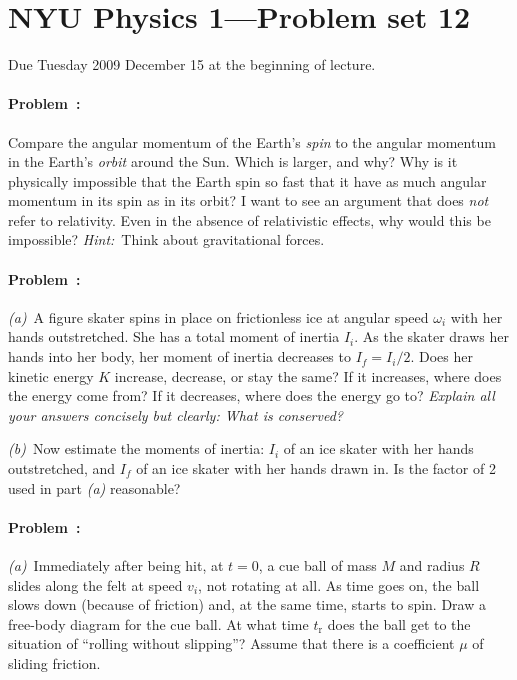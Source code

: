 \documentclass[12pt]{article}
\begin{document}
\thispagestyle{empty}

\section*{NYU Physics 1---Problem set 12}

Due Tuesday 2009 December 15 at the beginning of lecture.

\paragraph{Problem~\theproblem:}%
Compare the angular momentum of the Earth's \emph{spin} to the angular
momentum in the Earth's \emph{orbit} around the Sun.  Which is larger,
and why?  Why is it physically impossible that the Earth spin so fast
that it have as much angular momentum in its spin as in its orbit?  I
want to see an argument that does \emph{not} refer to relativity.
Even in the absence of relativistic effects, why would this be
impossible?  \emph{Hint:}~Think about gravitational forces.

\paragraph{Problem~\theproblem:}%
\textsl{(a)}~A figure skater spins in place on frictionless ice at
angular speed $\omega_i$ with her hands outstretched.  She has a total
moment of inertia $I_i$.  As the skater draws her hands into her body,
her moment of inertia decreases to $I_f=I_i/2$.  Does her kinetic
energy $K$ increase, decrease, or stay the same?  If it increases,
where does the energy come from?  If it decreases, where does the
energy go to?  \emph{Explain all your answers concisely but clearly:
What is conserved?}

\textsl{(b)}~Now estimate the moments of inertia: $I_i$ of an ice
skater with her hands outstretched, and $I_f$ of an ice skater with
her hands drawn in.  Is the factor of 2 used in part \textsl{(a)}
reasonable?

\paragraph{Problem~\theproblem:}%
\textsl{(a)}~Immediately after being hit, at $t=0$, a cue ball of mass
$M$ and radius $R$ slides along the felt at speed $v_i$, not rotating
at all.  As time goes on, the ball slows down (because of friction)
and, at the same time, starts to spin.  Draw a free-body diagram for
the cue ball.  At what time $t_\mathrm{r}$ does the ball get to the
situation of ``rolling without slipping''?  Assume that there is a
coefficient $\mu$ of sliding friction.
\end{document}
